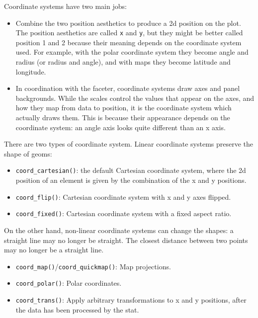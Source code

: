 Coordinate systems have two main jobs: 

\begin{itemize}
\item
  Combine the two position aesthetics to produce a 2d position on the
  plot. The position aesthetics are called \texttt{x} and \texttt{y},
  but they might be better called position 1 and 2 because their meaning
  depends on the coordinate system used. For example, with the polar
  coordinate system they become angle and radius (or radius and angle),
  and with maps they become latitude and longitude.
\item
  In coordination with the faceter, coordinate systems draw axes and
  panel backgrounds. While the scales control the values that appear on
  the axes, and how they map from data to position, it is the coordinate
  system which actually draws them. This is because their appearance
  depends on the coordinate system: an angle axis looks quite different
  than an x axis.
\end{itemize}

There are two types of coordinate system. Linear coordinate systems
preserve the shape of geoms:

\begin{itemize}
\item
  \texttt{coord\_cartesian()}: the default Cartesian coordinate system,
  where the 2d position of an element is given by the combination of the
  x and y positions.
\item
  \texttt{coord\_flip()}: Cartesian coordinate system with x and y axes
  flipped.
\item
  \texttt{coord\_fixed()}: Cartesian coordinate system with a fixed
  aspect ratio.
\end{itemize}

On the other hand, non-linear coordinate systems can change the shapes:
a straight line may no longer be straight. The closest distance between
two points may no longer be a straight line.

\begin{itemize}
\item
  \texttt{coord\_map()}/\texttt{coord\_quickmap()}: Map projections.
\item
  \texttt{coord\_polar()}: Polar coordinates.
\item
  \texttt{coord\_trans()}: Apply arbitrary transformations to x and y
  positions, after the data has been processed by the stat.
\end{itemize}

